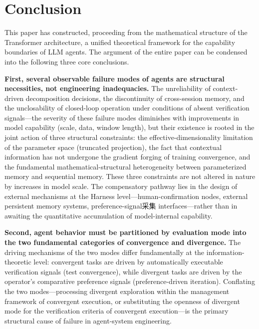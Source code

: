 \documentclass[11pt,a4paper]{article}
\theoremstyle{definition}
\begin{document}
\section{Conclusion}

This paper has constructed, proceeding from the mathematical structure of the Transformer architecture, a unified theoretical framework for the capability boundaries of LLM agents. The argument of the entire paper can be condensed into the following three core conclusions.

\textbf{First, several observable failure modes of agents are structural necessities, not engineering inadequacies.} The unreliability of context-driven decomposition decisions, the discontinuity of cross-session memory, and the unclosability of closed-loop operation under conditions of absent verification signals---the severity of these failure modes diminishes with improvements in model capability (scale, data, window length), but their existence is rooted in the joint action of three structural constraints: the effective-dimensionality limitation of the parameter space (truncated projection), the fact that contextual information has not undergone the gradient forging of training convergence, and the fundamental mathematical-structural heterogeneity between parameterized memory and sequential memory. These three constraints are not altered in nature by increases in model scale. The compensatory pathway lies in the design of external mechanisms at the Harness level---human-confirmation nodes, external persistent memory systems, preference-signal采集 interfaces---rather than in awaiting the quantitative accumulation of model-internal capability.

\textbf{Second, agent behavior must be partitioned by evaluation mode into the two fundamental categories of convergence and divergence.} The driving mechanisms of the two modes differ fundamentally at the information-theoretic level: convergent tasks are driven by automatically executable verification signals (test convergence), while divergent tasks are driven by the operator's comparative preference signals (preference-driven iteration). Conflating the two modes---processing divergent exploration within the management framework of convergent execution, or substituting the openness of divergent mode for the verification criteria of convergent execution---is the primary structural cause of failure in agent-system engineering.
\end{document}

